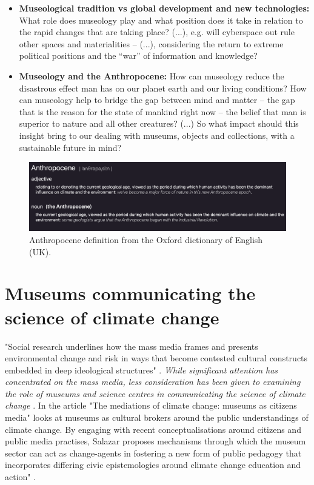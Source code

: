 \begin{itemize}
    \item \textbf{Museological tradition vs global development and new technologies:} What role does museology play and what position does it take in relation to the rapid changes that are taking place? (...), e.g. will cyberspace out rule other spaces and materialities – (...), considering the return to extreme political positions and the “war” of information and knowledge?
    \item \textbf{Museology and the Anthropocene:} How can museology reduce the disastrous effect man has on our planet earth and our living conditions? How can museology help to bridge the gap between mind and matter – the gap that is the reason for the state of mankind right now – the belief that man is superior to nature and all other creatures? (...) So what impact should this insight bring to our dealing with museums, objects and collections, with a sustainable future in mind?
\end{itemize}

\begin{figure}[H]
\includegraphics[width=12.5cm]{pictures/background/anthropocene.png}
\caption{Anthropocene definition from the Oxford dictionary of English (UK).}
\centering
\end{figure}

\section{Museums communicating the science of climate change}

"Social research underlines how the mass media frames and presents environmental change and risk in ways that become contested cultural constructs embedded in deep ideological structures" \autocite[p. 1]{salazar_mediations_2011}.\emph{ While significant attention has concentrated on the mass media, less consideration has been given to examining the role of museums and science centres in communicating the science of climate change} \autocite[p. 1]{salazar_mediations_2011}. In the article "The mediations of climate change: museums as citizens media" \autocite{salazar_mediations_2011} looks at museums as cultural brokers around the public understandings of climate change. By engaging with recent conceptualisations around citizens and public media practises, Salazar proposes mechanisms through which the museum sector can act as change-agents in fostering a new form of public pedagogy that incorporates differing civic epistemologies around climate change education and action" \autocite[p. 1]{salazar_mediations_2011}.

